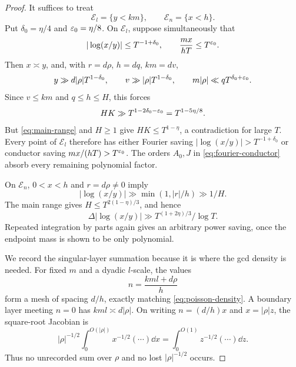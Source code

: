 \begin{proof}
It suffices to treat
\begin{equation}\label{eq:endpoint-regions}
             \mathcal E_l=\{y<km\},\qquad
             \mathcal E_n=\{x<h\}.
\end{equation}
Put $\delta_0=\eta/4$ and $\varepsilon_0=\eta/8$.  On $\mathcal E_l$, suppose
simultaneously that
\begin{equation}\label{eq:slow-small-assumption}
 |\log(x/y)|\leq T^{-1+\delta_0},\qquad
 \frac{mx}{hT}\leq T^{\varepsilon_0}.
\end{equation}
Then $x\asymp y$, and, with $r=d\rho$, $h=dq$, $km=dv$,
\begin{equation}\label{eq:scale-rho}
 y\gg d|\rho|T^{1-\delta_0},\qquad
 v\gg|\rho|T^{1-\delta_0},\qquad
 m|\rho|\ll qT^{\delta_0+\varepsilon_0}.
\end{equation}
Since $v\leq km$ and $q\leq h\leq H$, this forces
\begin{equation}\label{eq:scale-contradiction}
 HK\gg T^{1-2\delta_0-\varepsilon_0}=T^{1-5\eta/8}.
\end{equation}
But \eqref{eq:main-range} and $H\geq1$ give $HK\leq T^{1-\eta}$, a
contradiction for large $T$.  Every point of $\mathcal E_l$ therefore has
either Fourier saving $|\log(x/y)|>T^{-1+\delta_0}$ or conductor saving
$mx/(hT)>T^{\varepsilon_0}$.  The orders $A_0,J$ in
\eqref{eq:fourier-conductor} absorb every remaining polynomial factor.

On $\mathcal E_n$, $0<x<h$ and $r=d\rho\neq0$ imply
\begin{equation}\label{eq:n-endpoint-phase}
 |\log(x/y)|\gg\min(1,|r|/h)\gg 1/H.
\end{equation}
The main range gives $H\leq T^{2(1-\eta)/3}$, and hence
\begin{equation}\label{eq:n-endpoint-saving}
 \Delta|\log(x/y)|\gg T^{(1+2\eta)/3}/\log T.
\end{equation}
Repeated integration by parts again gives an arbitrary power saving, once
the endpoint mass is shown to be only polynomial.

We record the singular-layer summation because it is where the gcd density is
needed.  For fixed $m$ and a dyadic $l$-scale, the values
\[
                 n=\frac{kml+d\rho}{h}
\]
form a mesh of spacing $d/h$, exactly matching
\eqref{eq:poisson-density}.  A boundary layer meeting $n=0$ has
$kml\asymp d|\rho|$.  On writing $n=(d/h)x$ and $x=|\rho|z$, the square-root
Jacobian is
\begin{equation}\label{eq:square-root-jacobian}
 |\rho|^{-1/2}\int_0^{O(|\rho|)}x^{-1/2}(\cdots)\dd x
 =\int_0^{O(1)}z^{-1/2}(\cdots)\dd z.
\end{equation}
Thus no unrecorded sum over $\rho$ and no lost $|\rho|^{-1/2}$ occurs.


\end{proof}
